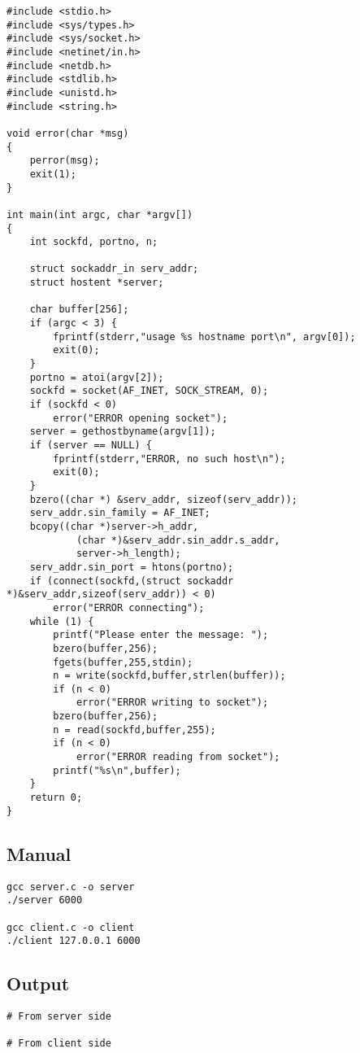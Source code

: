 \documentclass[12pt]{article}
\begin{document}
\begin{lstlisting}
#include <stdio.h>
#include <sys/types.h>
#include <sys/socket.h>
#include <netinet/in.h>
#include <netdb.h> 
#include <stdlib.h>
#include <unistd.h>
#include <string.h>

void error(char *msg)
{
	perror(msg);
	exit(1);
}

int main(int argc, char *argv[])
{
	int sockfd, portno, n;

	struct sockaddr_in serv_addr;
	struct hostent *server;

	char buffer[256];
	if (argc < 3) {
		fprintf(stderr,"usage %s hostname port\n", argv[0]);
		exit(0);
	}
	portno = atoi(argv[2]);
	sockfd = socket(AF_INET, SOCK_STREAM, 0);
	if (sockfd < 0) 
		error("ERROR opening socket");
	server = gethostbyname(argv[1]);
	if (server == NULL) {
		fprintf(stderr,"ERROR, no such host\n");
		exit(0);
	}
	bzero((char *) &serv_addr, sizeof(serv_addr));
	serv_addr.sin_family = AF_INET;
	bcopy((char *)server->h_addr, 
			(char *)&serv_addr.sin_addr.s_addr,
			server->h_length);
	serv_addr.sin_port = htons(portno);
	if (connect(sockfd,(struct sockaddr *)&serv_addr,sizeof(serv_addr)) < 0) 
		error("ERROR connecting");
	while (1) {
		printf("Please enter the message: ");
		bzero(buffer,256);
		fgets(buffer,255,stdin);
		n = write(sockfd,buffer,strlen(buffer));
		if (n < 0) 
			error("ERROR writing to socket");
		bzero(buffer,256);
		n = read(sockfd,buffer,255);
		if (n < 0) 
			error("ERROR reading from socket");
		printf("%s\n",buffer);
	}
	return 0;
}
\end{lstlisting}

\subsection{Manual}

\begin{lstlisting}
gcc server.c -o server
./server 6000

gcc client.c -o client
./client 127.0.0.1 6000
\end{lstlisting}

\subsection{Output}

\begin{lstlisting}
# From server side

# From client side
\end{lstlisting}
\end{document}
